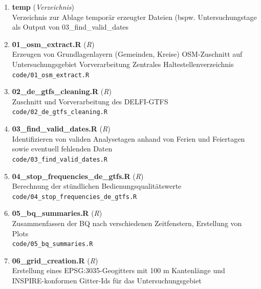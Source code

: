\begin{enumerate}[label=\arabic*., leftmargin=*, itemsep=0.5em, topsep=0.3em]
\begin{enumerate}[label=\arabic{enumi}.\arabic*, leftmargin=*, itemsep=0.5em, topsep=0.3em]
\begin{enumerate}[label=\arabic{enumi}.\arabic{enumii}.\arabic*, leftmargin=*, itemsep=0.5em, topsep=0.3em]
\item \textbf{polygrid\_fun.R} \textnormal{(\textit{R})}\\
Erstellung eines Geogitters\\
\texttt{\small code/helper/polygrid\_fun.R}
\item \textbf{school\_holidays.R} \textnormal{(\textit{R})}\\
Abfrage von Schulferien per API\\
\texttt{\small code/helper/school\_holidays.R}
\end{enumerate}
\item \textbf{temp} \textnormal{(\textit{Verzeichnis})}\\
Verzeichnis zur Ablage temporär erzeugter Dateien (bspw. Untersuchungstage als Output von 03\_find\_valid\_dates
\item \textbf{01\_osm\_extract.R} \textnormal{(\textit{R})}\\
Erzeugen von Grundlagenlayern (Gemeinden, Kreise)
OSM-Zuschnitt auf Untersuchungsgebiet
Vorverarbeitung Zentrales Haltestellenverzeichnis\\
\texttt{\small code/01\_osm\_extract.R}
\item \textbf{02\_de\_gtfs\_cleaning.R} \textnormal{(\textit{R})}\\
Zuschnitt und Vorverarbeitung des DELFI-GTFS\\
\texttt{\small code/02\_de\_gtfs\_cleaning.R}
\item \textbf{03\_find\_valid\_dates.R} \textnormal{(\textit{R})}\\
Identifizieren von validen Analysetagen anhand von Ferien und Feiertagen sowie eventuell fehlenden Daten\\
\texttt{\small code/03\_find\_valid\_dates.R}
\item \textbf{04\_stop\_frequencies\_de\_gtfs.R} \textnormal{(\textit{R})}\\
Berechnung der stündlichen Bedienungsqualitätswerte\\
\texttt{\small code/04\_stop\_frequencies\_de\_gtfs.R}
\item \textbf{05\_bq\_summaries.R} \textnormal{(\textit{R})}\\
Zusammenfassen der BQ nach verschiedenen Zeitfenstern, Erstellung von Plots\\
\texttt{\small code/05\_bq\_summaries.R}
\item \textbf{06\_grid\_creation.R} \textnormal{(\textit{R})}\\
Erstellung eines EPSG:3035-Geogitters mit 100 m Kantenlänge und INSPIRE-konformen Gitter-Ids für das Untersuchungsgebiet\\

\end{enumerate}
\end{enumerate}
